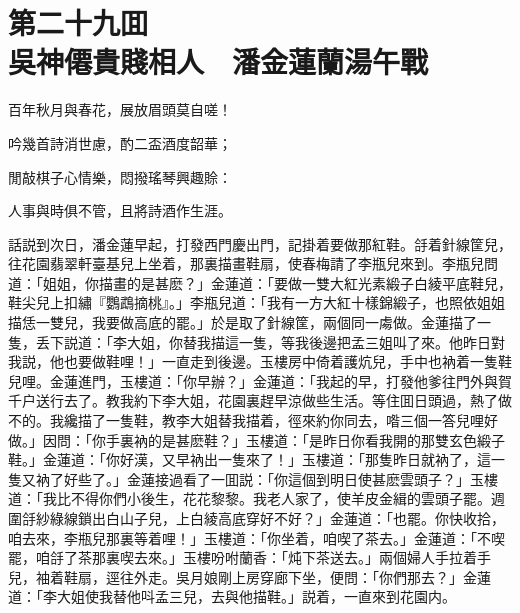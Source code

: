
\chapter*{第二十九囬　\\吳神僊貴賤相人　潘金蓮蘭湯午戰}


\begin{myquote}
百年秋月與春花，展放眉頭莫自嗟！

吟幾首詩消世慮，酌二盃酒度韶華；

閒敲棋子心情樂，悶撥瑤琴興趣賒：

人事與時俱不管，且將詩酒作生涯。
\end{myquote}

話説到次日，潘金蓮早起，打發西門慶出門，記掛着要做那紅鞋。㧱着針線筐兒，往花園翡翠軒臺基兒上坐着，那裏描畫鞋扇，使春梅請了李瓶兒來到。李瓶兒問道：「姐姐，你描畫的是甚麽？」金蓮道：「要做一雙大紅光素緞子白綾平底鞋兒，鞋尖兒上扣繡『鸚鵡摘桃』。」李瓶兒道：「我有一方大紅十樣錦緞子，也照依姐姐描恁一雙兒，我要做高底的罷。」於是取了針線筐，兩個同一䖏做。金蓮描了一隻，丢下説道：「李大姐，你替我描這一隻，等我後邊把孟三姐叫了來。他昨日對我説，他也要做鞋哩！」一直走到後邊。玉樓房中倚着護炕兒，手中也衲着一隻鞋兒哩。金蓮進門，玉樓道：「你早辦？」金蓮道：「我起的早，打發他爹往門外與賀千户送行去了。教我約下李大姐，花園裏趕早涼做些生活。等住囬日頭過，熱了做不的。我纔描了一隻鞋，教李大姐替我描着，徑來約你同去，喒三個一答兒哩好做。」因問：「你手裏衲的是甚麽鞋？」玉樓道：「是昨日你看我開的那雙玄色緞子鞋。」金蓮道：「你好漢，又早衲出一隻來了！」玉樓道：「那隻昨日就衲了，這一隻又衲了好些了。」金蓮接過看了一囬説：「你這個到明日使甚麽雲頭子？」玉樓道：「我比不得你們小後生，花花黎黎。我老人家了，使羊皮金緝的雲頭子罷。週圍㧱紗綠線鎖出白山子兒，上白綾高底穿好不好？」金蓮道：「也罷。你快收拾，咱去來，李瓶兒那裏等着哩！」玉樓道：「你坐着，咱喫了茶去。」金蓮道：「不喫罷，咱㧱了茶那裏喫去來。」玉樓吩咐蘭香：「炖下茶送去。」兩個婦人手拉着手兒，袖着鞋扇，逕往外走。吳月娘剛上房穿廊下坐，便問：「你們那去？」金蓮道：「李大姐使我替他呌孟三兒，去與他描鞋。」説着，一直來到花園内。

